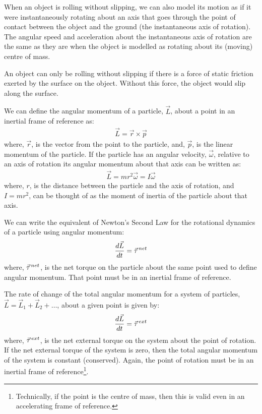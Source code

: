 \begin{chapterSummary}
When an object is rolling without slipping, we can also model its motion as if it were instantaneously rotating about an axis that goes through the point of contact between the object and the ground (the instantaneous axis of rotation). The angular speed and acceleration about the instantaneous axis of rotation are the same as they are when the object is modelled as rotating about its (moving) centre of mass. 

An object can only be rolling without slipping if there is a force of static friction exerted by the surface on the object. Without this force, the object would slip along the surface.

We can define the angular momentum of a particle, $\vec L$, about a point in an inertial frame of reference as:
\begin{align*}
\vec L = \vec r \times \vec p
\end{align*}
where, $\vec r$, is the vector from the point to the particle, and, $\vec p$, is the linear momentum of the particle. If the particle has an angular velocity, $\vec\omega$, relative to an axis of rotation its angular momentum about that axis can be written as:
\begin{align*}
\vec L = mr^2\vec\omega = I\vec\omega
\end{align*}
where, $r$, is the distance between the particle and the axis of rotation, and $I=mr^2$, can be thought of as the moment of inertia of the particle about that axis.

We can write the equivalent of Newton's Second Law for the rotational dynamics of a particle using angular momentum:
\begin{align*}
\frac{d\vec L}{dt}=\pvec\tau^{net}
\end{align*}
where, $\pvec \tau^{net}$, is the net torque on the particle about the same point used to define angular momentum. That point must be in an inertial frame of reference.

The rate of change of the total angular momentum for a system of particles, $\vec L=\vec L_1 + \vec L_2 +\dots$, about a given point is given by:
\begin{align*}
\frac{d\vec L}{dt}=\pvec\tau^{ext}
\end{align*}
where, $\pvec\tau^{ext}$, is the net external torque on the system about the point of rotation. If the net external torque of the system is zero, then the total angular momentum of the system is constant (conserved). Again, the point of rotation must be in an inertial frame of reference\footnote{Technically, if the point is the centre of mass, then this is valid even in an accelerating frame of reference.}.


\end{chapterSummary}
